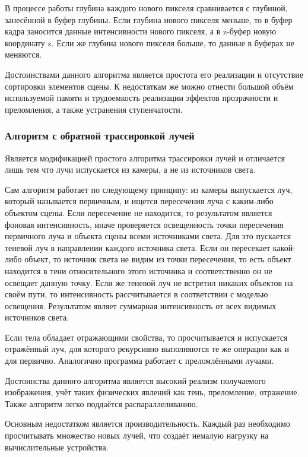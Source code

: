 В процессе работы глубина каждого нового пикселя сравнивается с глубиной, занесённой в буфер глубины. Если глубина нового пикселя меньше, то в буфер кадра заносится данные интенсивности нового пикселя, а в z-буфер новую координату z. Если же глубина нового пикселя больше, то данные в буферах не меняются.

Достоинствами данного алгоритма является простота его реализации и отсутствие сортировки элементов сцены. К недостаткам же можно отнести большой объём используемой памяти и трудоемкость реализации эффектов прозрачности и преломления, а также устранения ступенчатости.

\subsubsection{Алгоритм с обратной трассировкой лучей}

Является модификацией простого алгоритма трассировки лучей и отличается лишь тем что лучи испускается из камеры, а не из источников света.

Сам алгоритм работает по следующему принципу: из камеры выпускается луч, который называется первичным, и ищется пересечения луча с каким-либо объектом сцены. Если пересечение не находится, то результатом является фоновая интенсивность, иначе проверяется освещенность точки пересечения первичного луча и объекта сцены всеми источниками света. Для это пускается теневой луч в направлении каждого источника света. Если он пересекает какой-либо объект, то источник света не видим из точки пересечения, то есть объект находится в тени относительного этого источника и соответственно он не освещает данную точку. Если же теневой луч не встретил никаких объектов на своём пути, то интенсивность рассчитывается в соответствии с моделью освещения. Результатом являет суммарная интенсивность от всех видимых источников света.\cite{alg}

Если тела обладает отражающими свойства, то просчитывается и испускается отражённый луч, для которого рекурсивно выполняются те же операции как и для первично. Аналогично программа работает с преломлёнными лучами.

Достоинства данного алгоритма является высокий реализм получаемого изображения, учёт таких физических явлений как тень, преломление, отражение. Также алгоритм легко поддаётся распараллеливанию.

Основным недостатком является производительность. Каждый раз необходимо просчитывать множество новых лучей, что создаёт немалую нагрузку на вычислительные устройства.


